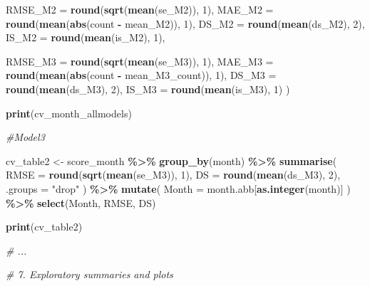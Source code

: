 \documentclass[
]{article}
\newenvironment{Shaded}{\begin{snugshade}}{\end{snugshade}}
\newcommand{\AttributeTok}[1]{\textcolor[rgb]{0.13,0.29,0.53}{#1}}
\newcommand{\CommentTok}[1]{\textcolor[rgb]{0.56,0.35,0.01}{\textit{#1}}}
\newcommand{\DecValTok}[1]{\textcolor[rgb]{0.00,0.00,0.81}{#1}}
\newcommand{\FunctionTok}[1]{\textcolor[rgb]{0.13,0.29,0.53}{\textbf{#1}}}
\newcommand{\NormalTok}[1]{#1}
\newcommand{\OtherTok}[1]{\textcolor[rgb]{0.56,0.35,0.01}{#1}}
\newcommand{\SpecialCharTok}[1]{\textcolor[rgb]{0.81,0.36,0.00}{\textbf{#1}}}
\newcommand{\StringTok}[1]{\textcolor[rgb]{0.31,0.60,0.02}{#1}}
\begin{document}
\begin{Shaded}
\begin{Highlighting}[]
    \AttributeTok{RMSE\_M2 =} \FunctionTok{round}\NormalTok{(}\FunctionTok{sqrt}\NormalTok{(}\FunctionTok{mean}\NormalTok{(se\_M2)), }\DecValTok{1}\NormalTok{),}
    \AttributeTok{MAE\_M2  =} \FunctionTok{round}\NormalTok{(}\FunctionTok{mean}\NormalTok{(}\FunctionTok{abs}\NormalTok{(count }\SpecialCharTok{{-}}\NormalTok{ mean\_M2)), }\DecValTok{1}\NormalTok{),}
    \AttributeTok{DS\_M2   =} \FunctionTok{round}\NormalTok{(}\FunctionTok{mean}\NormalTok{(ds\_M2), }\DecValTok{2}\NormalTok{),}
    \AttributeTok{IS\_M2   =} \FunctionTok{round}\NormalTok{(}\FunctionTok{mean}\NormalTok{(is\_M2), }\DecValTok{1}\NormalTok{),}
    
    \AttributeTok{RMSE\_M3 =} \FunctionTok{round}\NormalTok{(}\FunctionTok{sqrt}\NormalTok{(}\FunctionTok{mean}\NormalTok{(se\_M3)), }\DecValTok{1}\NormalTok{),}
    \AttributeTok{MAE\_M3  =} \FunctionTok{round}\NormalTok{(}\FunctionTok{mean}\NormalTok{(}\FunctionTok{abs}\NormalTok{(count }\SpecialCharTok{{-}}\NormalTok{ mean\_M3\_count)), }\DecValTok{1}\NormalTok{),}
    \AttributeTok{DS\_M3   =} \FunctionTok{round}\NormalTok{(}\FunctionTok{mean}\NormalTok{(ds\_M3), }\DecValTok{2}\NormalTok{),}
    \AttributeTok{IS\_M3   =} \FunctionTok{round}\NormalTok{(}\FunctionTok{mean}\NormalTok{(is\_M3), }\DecValTok{1}\NormalTok{)}
\NormalTok{  )}

\FunctionTok{print}\NormalTok{(cv\_month\_allmodels)}

\CommentTok{\#Model3 }

\NormalTok{cv\_table2 }\OtherTok{\textless{}{-}}\NormalTok{ score\_month }\SpecialCharTok{\%\textgreater{}\%}
  \FunctionTok{group\_by}\NormalTok{(month) }\SpecialCharTok{\%\textgreater{}\%}
  \FunctionTok{summarise}\NormalTok{(}
    \AttributeTok{RMSE =} \FunctionTok{round}\NormalTok{(}\FunctionTok{sqrt}\NormalTok{(}\FunctionTok{mean}\NormalTok{(se\_M3)), }\DecValTok{1}\NormalTok{),}
    \AttributeTok{DS   =} \FunctionTok{round}\NormalTok{(}\FunctionTok{mean}\NormalTok{(ds\_M3), }\DecValTok{2}\NormalTok{),}
    \AttributeTok{.groups =} \StringTok{"drop"}
\NormalTok{  ) }\SpecialCharTok{\%\textgreater{}\%}
  \FunctionTok{mutate}\NormalTok{(}
    \AttributeTok{Month =}\NormalTok{ month.abb[}\FunctionTok{as.integer}\NormalTok{(month)]}
\NormalTok{  ) }\SpecialCharTok{\%\textgreater{}\%}
  \FunctionTok{select}\NormalTok{(Month, RMSE, DS)}

\FunctionTok{print}\NormalTok{(cv\_table2)}

\CommentTok{\# ...}


\CommentTok{\# 7. Exploratory summaries and plots}


\end{Highlighting}
\end{Shaded}
\end{document}
